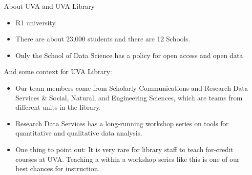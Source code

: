 \documentclass[
  ignorenonframetext,
]{beamer}
\providecommand{\tightlist}{%
  \setlength{\itemsep}{0pt}\setlength{\parskip}{0pt}}
\begin{document}
\begin{frame}{About UVA and UVA Library}
{\begin{itemize}
\tightlist
\item
  R1 university.
\item
  There are about 23,000 students and there are 12 Schools.
\item
  Only the School of Data Science has a policy for open access and open
  data
\end{itemize}

And some context for UVA Library:

\begin{itemize}
\tightlist
\item
  Our team members come from Scholarly Communications and Research Data
  Services \& Social, Natural, and Engineering Sciences, which are teams
  from different units in the library.
\item
  Research Data Services has a long-running workshop series on tools for
  quantitative and qualitative data analysis.
\item
  One thing to point out: It is very rare for library staff to teach
  for-credit courses at UVA. Teaching a within a workshop series like
  this is one of our best chances for instruction.
\end{itemize}}
\end{frame}
\end{document}

